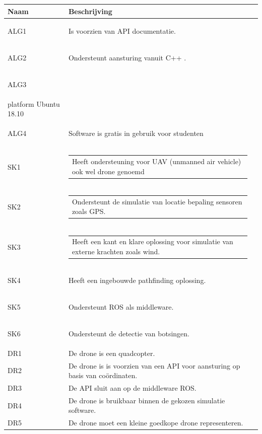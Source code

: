 \documentclass[a4paper, 11pt, oneside]{report}
\begin{document}
\begin{longtable}{|l|l|l|}
	\hline
	\rowcolor[HTML]{C0C0C0} 
	Naam & Beschrijving \\ \hline
	\endhead
		\hypertarget{alg1}{ALG1}	&Is voorzien van API documentatie.        \\ \hline
		\hypertarget{alg2}{ALG2}	&Ondersteunt aansturing vanuit C++ .    \\ \hline
		\hypertarget{alg3}{ALG3}	&\begin{tabular}[c]{@{}l@{}}Heeft ondersteuning voor het Linux\\ platform Ubuntu 18.10\end{tabular}        \\ \hline
		\hypertarget{alg4}{ALG4}	&Software is gratis in gebruik voor studenten        \\ \hline
		\hypertarget{sk1}{SK1}		&\begin{tabular}[c]{@{}l@{}}Heeft ondersteuning voor UAV (unmanned air vehicle) ook wel drone genoemd\end{tabular} \\ \hline
		\hypertarget{sk2}{SK2}		&\begin{tabular}[c]{@{}l@{}}Ondersteunt de simulatie van locatie bepaling sensoren zoals GPS.\end{tabular}        \\ \hline
		\hypertarget{sk3}{SK3}		&\begin{tabular}[c]{@{}l@{}}Heeft een kant en klare oplossing voor simulatie van externe krachten zoals wind.\end{tabular}        \\ \hline
		\hypertarget{sk4}{SK4}		& Heeft een ingebouwde pathfinding oplossing.        \\ \hline
		\hypertarget{sk5}{SK5}		& Ondersteunt ROS als middleware.        \\ \hline
		\hypertarget{sk6}{SK6}		& Ondersteunt de detectie van botsingen.        \\ \hline
		DR1		& De drone is een quadcopter.        \\ \hline
		DR2		& De drone is is voorzien van een API voor aansturing op basis van coördinaten.       \\ \hline
		DR3		& De API sluit aan op de middleware ROS.        \\ \hline
		DR4		& De drone is bruikbaar binnen de gekozen simulatie software.        \\ \hline%
		DR5		& De drone moet een kleine goedkope drone representeren.        \\ \hline

\end{longtable}
\end{document}
